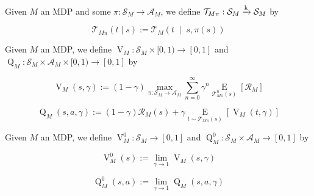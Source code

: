 \documentclass[anon,12pt]{colt2018} %
\newcommand{\Comment}[1]{}
\newcommand{\AB}[1]{\left[#1\right]}
\newcommand{\APM}[2]{\left(#1\;\middle\vert\;#2\right)}
\newcommand{\Ea}[2]{\underset{#1}{\operatorname{E}}\AB{#2}}
\newcommand{\K}{\xrightarrow{\textnormal{k}}}
\newcommand{\A}{\mathcal{A}}
\newcommand{\St}{\mathcal{S}}
\newcommand{\T}{\mathcal{T}}
\newcommand{\R}{\mathcal{R}}
\newcommand{\V}{\operatorname{V}}
\newcommand{\Q}{\operatorname{Q}}
\begin{document}
\begin{samepage}
\begin{definition}

Given $M$ an MDP and some $\pi: \St_M \rightarrow \A_M$, we define $\T_{M\pi}: \St_M \K \St_M$ by

\begin{equation}
\T_{M\pi}(t \mid s) := \T_M\APM{t}{s,\pi(s)}
\end{equation}

\Comment{That is, $\T_{M\pi}$ is the transition kernel of the Markov chain resulting from policy $\pi$ interacting with environment $M$.}

\end{definition}
\end{samepage}

\begin{samepage}
\begin{definition}
\label{def:vq}

Given $M$ an MDP, we define $\V_M : \St_M \times [0,1) \rightarrow [0,1]$ and $\Q_M: \St_M \times \A_M \times [0,1) \rightarrow [0,1]$ by

\begin{equation}
\label{eqn:def__vq__v}
\V_M(s,\gamma):=(1-\gamma) \max_{\pi: \St_M \rightarrow \A_M} \sum_{n=0}^\infty \gamma^n \Ea{\T_{M\pi}^n(s)}{\R_M}
\end{equation}

\begin{equation}
\label{eqn:def__vq__q}
\Q_M(s,a,\gamma):=(1-\gamma)\R_M(s)+\gamma\Ea{t \sim \T_{M\pi}(s)}{\V_M(t,\gamma)}
\end{equation}

\Comment{Thus, $\V_M(s,\gamma)$ is the maximal value that can be extracted from state $s$ and $\Q_M(s,a,\gamma)$ is the maximal value that can be extracted from state $s$ after performing action $a$.}

\end{definition}
\end{samepage}

\begin{samepage}
\begin{definition}

Given $M$ an MDP, we define $\V^0_M : \St_M \rightarrow [0,1]$ and $\Q^0_M: \St_M \times \A_M \rightarrow [0,1]$ by

\begin{equation}
\V_M^0(s) := \lim_{\gamma \rightarrow 1} \V_M(s,\gamma)
\end{equation}

\begin{equation}
\Q_M^0(s,a) := \lim_{\gamma \rightarrow 1} \Q_M(s,a,\gamma)
\end{equation}

\Comment{Indeed, the limits above are guaranteed to exist. We can think of them as describing the \enquote{long term planning} regime.}

\end{definition}
\end{samepage}
\end{document}
